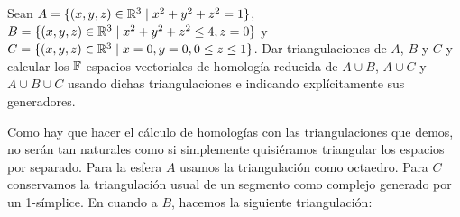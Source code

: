\documentclass[twoside]{article}
\begin{document}
\newpage

\begin{ejercicio}{2}
Sean $A=\{(x,y,z)\in\mathbb{R}^3\mid x^2+y^2+z^2=1\}$, $B=\{(x,y,z)\in\mathbb{R}^3\mid x^2+y^2+z^2\leq 4, z=0\}$ y $C=\{(x,y,z)\in\mathbb{R}^3\mid x=0,y=0, 0\leq z\leq 1\}$. Dar triangulaciones de $A$, $B$ y $C$ y calcular los $\mathbb{F}$-espacios vectoriales de homología reducida de $A\cup B$, $A\cup C$ y $A\cup B\cup C$ usando dichas triangulaciones e indicando explícitamente sus generadores.
\end{ejercicio}
\begin{solucion}
Como hay que hacer el cálculo de homologías con las triangulaciones que demos, no serán tan naturales como si simplemente quisiéramos triangular los espacios por separado. Para la esfera $A$ usamos la triangulación como octaedro.  Para $C$ conservamos la triangulación usual de un segmento como complejo generado por un 1-símplice. En cuando a $B$, hacemos la siguiente triangulación:


\end{solucion}
\end{document}
